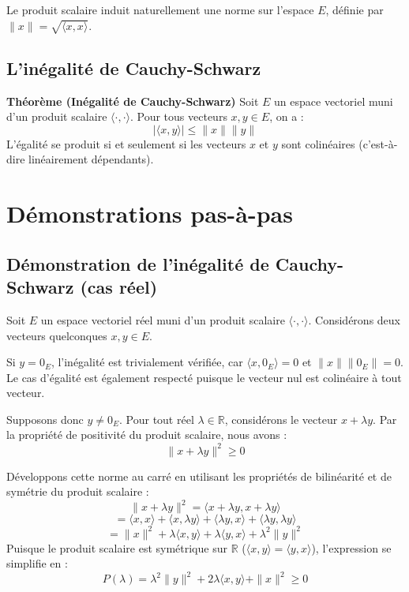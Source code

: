 \documentclass[11pt,a4paper]{report}
\begin{document}
Le produit scalaire induit naturellement une norme sur l'espace $E$, définie par $\|x\| = \sqrt{\langle x, x \rangle}$.

\subsection{L'inégalité de Cauchy-Schwarz}
\textbf{Théorème (Inégalité de Cauchy-Schwarz)}
Soit $E$ un espace vectoriel muni d'un produit scalaire $\langle \cdot, \cdot \rangle$. Pour tous vecteurs $x, y \in E$, on a :
$$| \langle x, y \rangle | \le \|x\| \|y\|$$
L'égalité se produit si et seulement si les vecteurs $x$ et $y$ sont colinéaires (c'est-à-dire linéairement dépendants).

\section{Démonstrations pas-à-pas}

\subsection{Démonstration de l'inégalité de Cauchy-Schwarz (cas réel)}

Soit $E$ un espace vectoriel réel muni d'un produit scalaire $\langle \cdot, \cdot \rangle$. Considérons deux vecteurs quelconques $x, y \in E$.

Si $y = 0_E$, l'inégalité est trivialement vérifiée, car $\langle x, 0_E \rangle = 0$ et $\|x\| \|0_E\| = 0$. Le cas d'égalité est également respecté puisque le vecteur nul est colinéaire à tout vecteur.

Supposons donc $y \neq 0_E$. Pour tout réel $\lambda \in \mathbb{R}$, considérons le vecteur $x + \lambda y$. Par la propriété de positivité du produit scalaire, nous avons :
$$\|x + \lambda y\|^2 \ge 0$$

Développons cette norme au carré en utilisant les propriétés de bilinéarité et de symétrie du produit scalaire :
$$\|x + \lambda y\|^2 = \langle x + \lambda y, x + \lambda y \rangle$$
$$= \langle x, x \rangle + \langle x, \lambda y \rangle + \langle \lambda y, x \rangle + \langle \lambda y, \lambda y \rangle$$
$$= \|x\|^2 + \lambda \langle x, y \rangle + \lambda \langle y, x \rangle + \lambda^2 \|y\|^2$$
Puisque le produit scalaire est symétrique sur $\mathbb{R}$ ($\langle x, y \rangle = \langle y, x \rangle$), l'expression se simplifie en :
$$P(\lambda) = \lambda^2 \|y\|^2 + 2\lambda \langle x, y \rangle + \|x\|^2 \ge 0$$
\end{document}

